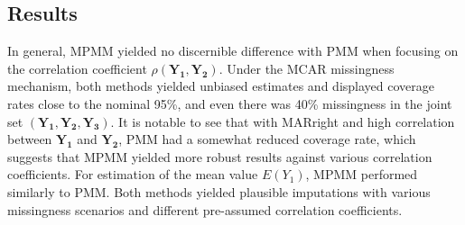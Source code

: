 	\subsection{Results}
	\begin{table}[ht!]
		\centering
		\caption{Simulation results for evaluating whether MPMM provide valid imputations at the univariate level.}
		\label{tab3_1}
	\end{table}   
	
	In general, MPMM yielded no discernible difference with PMM when focusing on the correlation coefficient $\rho(\boldsymbol{Y_{1}}, \boldsymbol{Y_{2}})$. Under the MCAR missingness mechanism, both methods yielded unbiased estimates and displayed coverage rates close to the nominal 95\%, and even there was 40\% missingness in the joint set $(\boldsymbol{Y_1, Y_2, Y_3})$. It is notable to see that with MARright and high correlation between $\boldsymbol{Y_{1}}$ and $\boldsymbol{Y_{2}}$, PMM had a somewhat reduced coverage rate, which suggests that MPMM yielded more robust results against various correlation coefficients. For estimation of the mean value $E(Y_{1})$, MPMM performed similarly to PMM. Both methods yielded plausible imputations with various missingness scenarios and different pre-assumed correlation coefficients. 
	
